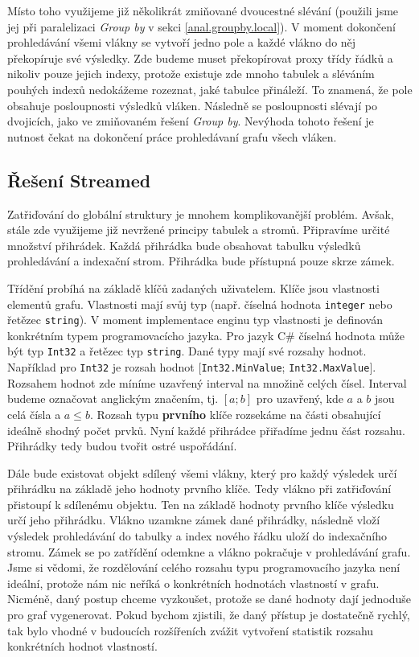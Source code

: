 Místo toho využijeme již několikrát zmiňované dvoucestné slévání (použili jsme jej při paralelizaci \textit{Group by} v sekci \ref{anal.groupby.local}).
V moment dokončení prohledávání všemi vlákny se vytvoří jedno pole a každé vlákno do něj překopíruje své výsledky.
Zde budeme muset překopírovat proxy třídy řádků a nikoliv pouze jejich indexy, protože existuje zde mnoho tabulek a sléváním pouhých indexů nedokážeme rozeznat, jaké tabulce přináleží.
To znamená, že pole obsahuje posloupnosti výsledků vláken.
Následně se posloupnosti slévají po dvojicích, jako ve zmiňovaném řešení \textit{Group by}. 
Nevýhoda tohoto řešení je nutnost čekat na dokončení práce prohledávaní grafu všech vláken.
 
\subsection{Řešení Streamed} \label{anal.improvement.orderby.streamed}

Zatřiďování do globální struktury je mnohem komplikovanější problém.
Avšak, stále zde využijeme již nevržené principy tabulek a stromů.
Připravíme určité množství přihrádek.
Každá přihrádka bude obsahovat tabulku výsledků prohledávání a indexační strom.
Přihrádka bude přístupná pouze skrze zámek.

Třídění probíhá na základě klíčů zadaných uživatelem.
Klíče jsou vlastnosti elementů grafu.
Vlastnosti mají svůj typ (např. číselná hodnota \texttt{integer} nebo řetězec \texttt{string}).
V moment implementace enginu typ vlastnosti je definován konkrétním typem programovacícho jazyka.
Pro jazyk C\# číselná hodnota může být typ \texttt{Int32} a řetězec typ \texttt{string}.
Dané typy mají své rozsahy hodnot.
Například pro \texttt{Int32} je rozsah hodnot $[$\texttt{Int32.MinValue}; \texttt{Int32.MaxValue}$]$.
Rozsahem hodnot zde míníme uzavřený interval na množině celých čísel.
Interval budeme označovat anglickým značením, tj. $[a; b]$ pro uzavřený, kde $a$ a $b$ jsou celá čísla a $a\leq b$.
Rozsah typu \textbf{prvního} klíče rozsekáme na části obsahující ideálně shodný počet prvků. 
Nyní každé přihrádce přiřadíme jednu část rozsahu. 
Přihrádky tedy budou tvořit ostré uspořádání.

Dále bude existovat objekt sdílený všemi vlákny, který pro každý výsledek určí přihrádku na základě jeho hodnoty prvního klíče.
Tedy vlákno při zatřiďování přistoupí k sdílenému objektu.
Ten na základě hodnoty prvního klíče výsledku určí jeho přihrádku.
Vlákno uzamkne zámek dané přihrádky, následně vloží výsledek prohledávání do tabulky a index nového řádku uloží do indexačního stromu.
Zámek se po zatřídění odemkne a vlákno pokračuje v prohledávání grafu.
Jsme si vědomi, že rozdělování celého rozsahu typu programovacího jazyka není ideální, protože nám nic neříká o konkrétních hodnotách vlastností v grafu.
Nicméně, daný postup chceme vyzkoušet, protože se dané hodnoty dají jednoduše pro graf vygenerovat.
Pokud bychom zjistili, že daný přístup je dostatečně rychlý, tak bylo vhodné v budoucích rozšířeních zvážit vytvoření statistik rozsahu konkrétních hodnot vlastností.

